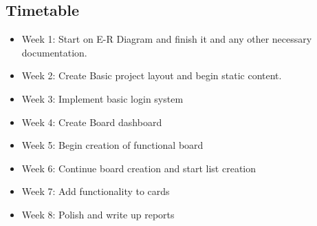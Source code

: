 \documentclass[letterpaper]{article}
\begin{document}
\subsection{Timetable}
\begin{itemize}
  \item Week 1: Start on E-R Diagram and finish it and any other necessary documentation.
  \item Week 2: Create Basic project layout and begin static content.
  \item Week 3: Implement basic login system
  \item Week 4: Create Board dashboard
  \item Week 5: Begin creation of functional board
  \item Week 6: Continue board creation and start list creation
  \item Week 7: Add functionality to cards
  \item Week 8: Polish and write up reports
\end{itemize}
\end{document}
